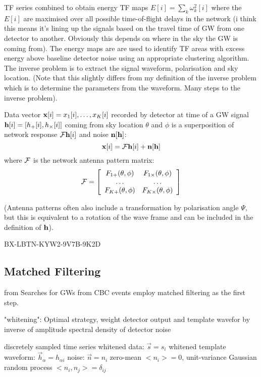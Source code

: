 TF series combined to obtain energy TF maps $E[i]=\sum_k \omega^2_k [i]$ where the $E[i]$ are maximised over all possible time-of-flight delays in the network (i think this means it's lining up the signals based on the travel time of GW from one detector to another. Obviously this depends on where in the sky the GW is coming from). The energy maps are are used to identify TF areas with excess energy above baseline detector noise using an appropriate clustering algorithm. The inverse problem is to extract the signal waveform, polarisation and sky location. (Note that this slightly differs from my definition of the inverse problem which is to determine the parameters from the waveform. Many steps to the inverse problem). 

Data vector ${\mathbf{x}} [i]={x_1[i], \ldots , x_K[i]}$ recorded by detector at time of a GW signal $\mathbf{h} [i] = [h_+[i], h_{\times}[i] ]$ coming from sky location $\theta$ and $\phi$ is a superposition of network response $\mathcal{F} \mathbf{h}[i]$ and noise $\mathbf{n}[\mathbf{h}]$:
\[ {\mathbf{x}} [i] = \mathcal{F} \mathbf{h}[i]+\mathbf{n}[\mathbf{h}] \]
where $\mathcal{F}$ is the network antenna pattern matrix:
\[ \mathcal{F} = \left[ \begin{array}{cc} 
				F_{1+}(\theta, \phi) & F_{1\times}(\theta, \phi) \\
				\ldots				& \ldots	\\
				F_{K+}(\theta, \phi) & F_{K \times}(\theta, \phi) \end{array} \right] \]

(Antenna patterns often also include a transformation by polarisation angle $\Psi$, but this is equivalent to a rotation of the wave frame and can be included in the definition of $\mathbf{h}$).

BX-LBTN-KYW2-9V7B-9K2D
\subsection{Matched Filtering}

from \cite{PhysRevD.82.044025}
Searches for GWs from CBC events employ matched filtering as the first step. 

"whitening": Optimal strategy, weight detector output and template wavefor by inverse of amplitude spectral density of detector noise 

discretely sampled time series
whitened data: $\overrightarrow{s}={s_i}$
whitened template waveform: $\overrightarrow{h}_\alpha = h_{\alpha i}$
noise: $\overrightarrow{n}={n_i}$ zero-mean $<n_i>=0$, unit-variance Gaussian random process $<n_i,n_j>=\delta_{ij}$


